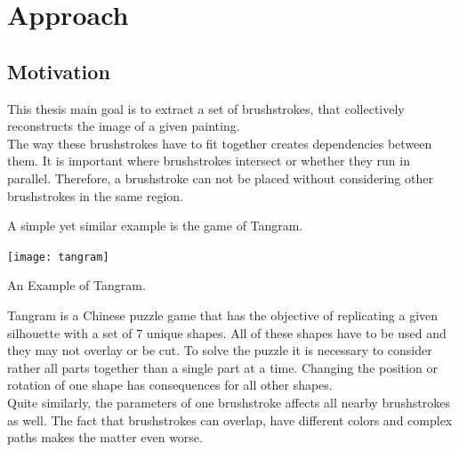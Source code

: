\setchapterpreamble[u]{\margintoc}
\chapter{Approach}


\section{Motivation}

%
%

This thesis main goal is to extract a set of brushstrokes, that collectively reconstructs the image of a given painting. \\
The way these brushstrokes have to fit together creates dependencies between them.
It is important where brushstrokes intersect or whether they run in parallel.
Therefore, a brushstroke can not be placed without considering other brushstrokes in the same region.

A simple yet similar example is the game of Tangram.
\begin{marginfigure}
    \texttt{[image: tangram]}
    \caption{An Example of Tangram.}
\end{marginfigure}
Tangram is a Chinese puzzle game that has the objective of replicating a given silhouette with a set of 7 unique shapes.
All of these shapes have to be used and they may not overlay or be cut.
To solve the puzzle it is necessary to consider rather all parts together than a single part at a time.
Changing the position or rotation of one shape has consequences for all other shapes.\\
Quite similarly, the parameters of one brushstroke affects all nearby brushstrokes as well.
The fact that brushstrokes can overlap, have different colors and complex paths makes the matter even worse.

